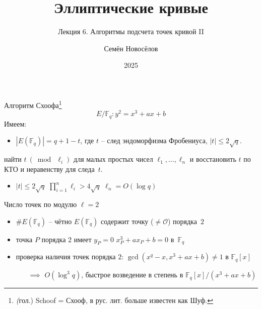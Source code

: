 \documentclass{beamer}
\title{Эллиптические кривые}
\subtitle{Лекция 6. Алгоритмы подсчета точек кривой II}
\author{Семён Новосёлов}
\institute{БФУ им. И. Канта}
\date{2025}
\begin{document}
\frame{\titlepage}

%    

\begin{frame}{Алгоритм Схоофа\footnote{\textit(гол.) Schoof = Схооф, в рус. лит. больше известен как Шуф.}}
\[
E/\mathbb{F}_q: y^2 = x^3 + a x + b
\]
Имеем:
\begin{itemize}
    \item $|E(\mathbb{F}_q)| = q + 1 - t$, где $t$ -- след эндоморфизма Фробениуса, $|t| \leq 2 \sqrt{q}$.
\end{itemize}

\vspace{1em}
 найти $t~(\bmod~\ell_i)$ для малых простых чисел $\ell_1, \ldots, \ell_n$ и восстановить $t$ по КТО и неравенству для следа~$t$.

\begin{itemize}
    \item $|t| \leq 2 \sqrt{q}$ \structure{$\implies$} $\prod_{i=1}^{n} \ell_i > 4 \sqrt{q}$ \structure{$\implies$} $\ell_n = O(\log{q})$
\end{itemize}
\end{frame}

\begin{frame}{Число точек по модулю $\ell = 2$}
    \begin{itemize}
        \item $\#E(\mathbb{F}_q)$ -- чётно \structure{$\iff$} $E(\mathbb{F}_q)$ содержит точку ($\neq \mathcal{O}$) порядка~$2$
        \vspace{0.5em}
        \item точка $P$ порядка $2$ имеет $y_P=0$ \structure{$\iff$} $x_P^3 + a x_P + b = 0$ в~$\mathbb{F}_q$
        \vspace{0.5em}
        \item проверка наличия точек порядка $2$: $\gcd(x^q - x, x^3 + a x + b) \neq 1$ в $\mathbb{F}_q[x]$
        \begin{itemize}
            \item[$\implies$] $O(\log^3{q})$, быстрое возведение в степень в $\mathbb{F}_q[x]/(x^3 + a x + b)$
         \end{itemize}
    \end{itemize}
\end{frame}
\end{document}

